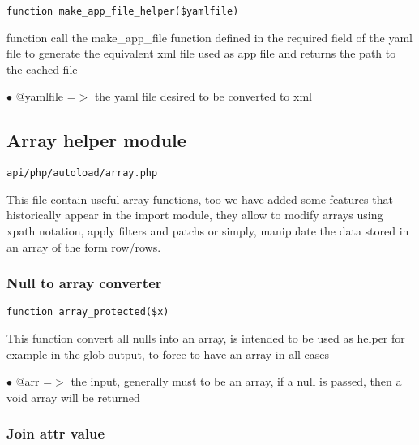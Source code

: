 \documentclass[a4paper]{article}
\begin{document}
\begin{lstlisting}
function make_app_file_helper($yamlfile)
\end{lstlisting}

function call the make\_app\_file function defined in the required
field of the yaml file to generate the equivalent xml file used
as app file and returns the path to the cached file

\begin{compactitem}
\item[\color{myblue}$\bullet$] @yamlfile =$>$ the yaml file desired to be converted to xml
\end{compactitem}

\hypertarget{toc49}{}
\subsection{Array helper module}

\begin{lstlisting}
api/php/autoload/array.php
\end{lstlisting}

This file contain useful array functions, too we have added some features
that historically appear in the import module, they allow to modify arrays
using xpath notation, apply filters and patchs or simply, manipulate the
data stored in an array of the form row/rows.

\hypertarget{toc50}{}
\subsubsection{Null to array converter}

\begin{lstlisting}
function array_protected($x)
\end{lstlisting}

This function convert all nulls into an array, is intended to be
used as helper for example in the glob output, to force to have
an array in all cases

\begin{compactitem}
\item[\color{myblue}$\bullet$] @arr =$>$ the input, generally must to be an array, if a null is passed,
        then a void array will be returned
\end{compactitem}

\hypertarget{toc51}{}
\subsubsection{Join attr value}
\end{document}
